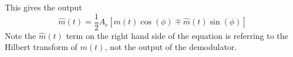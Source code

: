 \documentclass{article}
\begin{document}
This gives the output
\begin{equation*}
    \hat{m}\left( t \right) = \frac{1}{2} A_c \left[ m\left( t \right) \cos{\left( \phi \right)} \mp \hat{m}\left( t \right) \sin{\left( \phi \right)} \right]
\end{equation*}
Note the \(\hat{m}\left( t \right)\) term on the right hand side of the equation is referring to the Hilbert transform of \(m\left( t \right)\), not the output of the demodulator.
\end{document}
